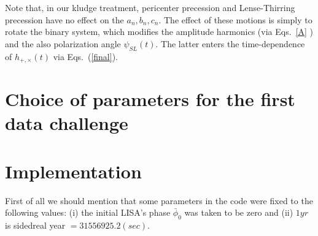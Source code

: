 \documentclass[11pt]{report}
\begin{document}
Note that, in our kludge treatment, pericenter precession and Lense-Thirring
precession have no effect on the $a_n, b_n, c_n$.  The effect of these motions is simply to
rotate the binary system, which modifies the amplitude harmonics (via Eqs.~\ref{A} ) and the 
also polarization angle $\psi_{SL}(t)$. The latter enters the time-dependence of
$h_{+,\times}(t)$ via Eqs.~(\ref{final}). 

\section{Choice of parameters for the first data challenge}

\section{Implementation}

First of all we should mention that some parameters in the code 
were fixed to the following values:
(i) the initial LISA's phase $\bar{\phi}_0$ was taken to be zero 
and (ii) $1yr$ is sidedreal year $= 31556925.2 (sec)$.
\end{document}
